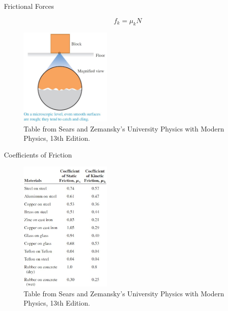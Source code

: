 \documentclass[]{beamer}
\begin{document}


    \begin{frame}
      
      Frictional Forces
    \vspace{3mm}
    
\begin{equation}
  f_k=\mu_k N
\end{equation}
   

          \vspace{3mm}
    
          \begin{figure}[h!]  
            \includegraphics[width=0.4\textwidth]{images/f22.jpg}
            \caption{ {\tiny Table from Sears and Zemansky's University Physics 
            with Modern Physics, 13th Edition.} }
          \end{figure}


        \end{frame}




    \begin{frame}
      
 Coefficients of Friction
    \vspace{3mm}
    
    \begin{figure}[h!]  
      \includegraphics[width=0.4\textwidth]{images/f20.jpg}
      \caption{ {\tiny Table from Sears and Zemansky's University Physics 
      with Modern Physics, 13th Edition.} }
    \end{figure}

          \end{frame}
\end{document}
